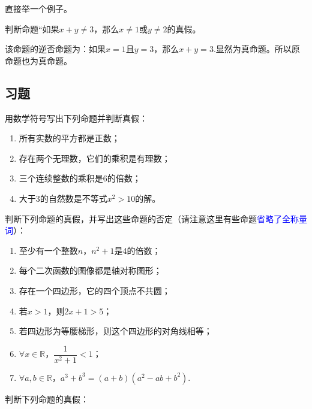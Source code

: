 \documentclass[lang=cn,math=cm,chinesefont=nofont,11pt,scheme=chinese,onecol]{elegantbook}
\begin{document}
直接举一个例子。

\begin{example}
  判断命题“如果$x+y\neq 3$，那么$x\neq 1$或$y\neq 2$的真假。
\end{example}

\begin{solution}
  该命题的逆否命题为：如果$x=1$且$y=3$，那么$x+y=3$.显然为真命题。所以原命题也为真命题。
\end{solution}

\subsection{习题}

\begin{exercise}
  用数学符号写出下列命题并判断真假：
\end{exercise}

\begin{enumerate}
  \item 所有实数的平方都是正数；
  \item 存在两个无理数，它们的乘积是有理数；
  \item 三个连续整数的乘积是6的倍数；
  \item 大于3的自然数是不等式$x^2>10$的解。
\end{enumerate}

\begin{exercise}
  判断下列命题的真假，并写出这些命题的否定（请注意这里有些命题\textcolor{blue}{省略了全称量词}）：
\end{exercise}

\begin{enumerate}
  \item 至少有一个整数$n$，$n^2+1$是4的倍数；
  \item 每个二次函数的图像都是轴对称图形；
  \item 存在一个四边形，它的四个顶点不共圆；
  \item 若$x>1$，则$2x+1>5$；
  \item 若四边形为等腰梯形，则这个四边形的对角线相等；
  \item $\forall x{\in}\mathbb{R}$，$\dfrac1{x^2+1}{<}1$；
  \item $\forall a,b{\in}\mathbb{R}$，$a^3+b^3=(a+b)(a^2-ab+b^2)$.
\end{enumerate}

\begin{exercise}
  判断下列命题的真假：
\end{exercise}
\end{document}
